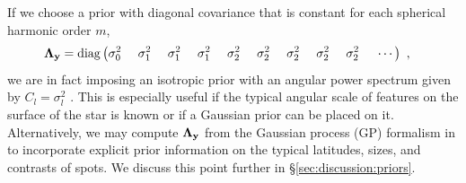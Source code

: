\documentclass[modern]{aastex631}
\begin{document}
%
If we choose a prior with diagonal covariance that is constant for each spherical harmonic order $m$,
%
\begin{align}
    \label{eq:isotropicprior}
    \boldsymbol{\Lambda}_\bvec{y} & =
    \mathrm{diag} \left(
    \sigma_0^2
    \quad\quad\quad\quad
    \sigma_1^2
    \quad\quad\quad\quad
    \sigma_1^2
    \quad\quad\quad\quad
    \sigma_1^2
    \quad\quad\quad\quad
    \sigma_2^2
    \quad\quad\quad\quad
    \sigma_2^2
    \quad\quad\quad\quad
    \sigma_2^2
    \quad\quad\quad\quad
    \sigma_2^2
    \quad\quad\quad\quad
    \sigma_2^2
    \quad\quad\quad\quad
    \cdots
    \right)
    \quad,
\end{align}
%
we are in fact imposing an isotropic prior with an angular power spectrum given by $C_l = \sigma_l^2$
\citep[e.g.,][]{Baldi2006}. 
This is especially useful if the typical angular scale of features on the surface of the star is known or if a Gaussian prior can be placed on it.
Alternatively, we may compute $\boldsymbol{\Lambda}_{\mathbf{y}}$ from the Gaussian process (GP) formalism in \citet{Luger2021b} to incorporate explicit prior information on the typical latitudes, sizes, and contrasts of spots.
We discuss this point further in \S\ref{sec:discussion:priors}.
\end{document}
